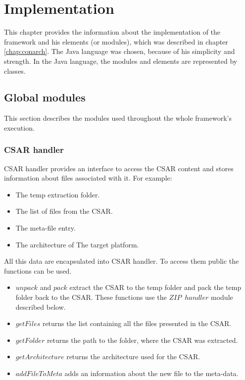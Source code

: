 
\chapter{Implementation}\label{chap:imp}
This chapter provides the information about the implementation of the framework and his elements (or modules), which was described in chapter \ref{chap:conarch}.
The Java language was chosen, because of his simplicity and strength. 
In the Java language, the modules and elements are represented by classes.

\section{Global modules}
This section describes the modules used throughout the whole framework's execution.

\subsection*{CSAR handler}
CSAR handler provides an interface to access the CSAR content and stores information about files associated with it.
For example:
\begin{itemize}
	\item The temp extraction folder.
	\item The list of files from the CSAR.
	\item The meta-file entry.
	\item The architecture of The target platform.
\end{itemize}
All this data are encapsulated into CSAR handler.
To access them public the functions can be used.
\begin{itemize}
	\item $unpack$ and $pack$ extract the CSAR to the temp folder and pack the temp folder back to the CSAR. 
	These functions use the $ZIP$~$handler$ module described below.
	\item $getFiles$ returns the list containing all the files presented in the CSAR.
	\item $getFolder$ returns the path to the folder, where the CSAR was extracted.
	\item $getArchitecture$ returns the architecture used for the CSAR.
	\item $addFileToMeta$ adds an information about the new file to the meta-data.
\end{itemize}

